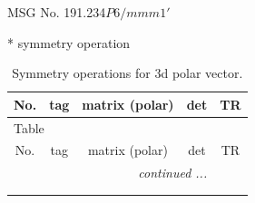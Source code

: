 \documentclass[fleqn,8pt]{jsarticle}
\begin{document}
\setcounter{MaxMatrixCols}{32}

\renewcommand{\tablename}{Table~}
\renewcommand{\figurename}{Figure~}
\begin{center}
\LARGE
MSG No. 191.234\quad$P6/mmm1'$
\end{center}
* symmetry operation
\renewcommand{\arraystretch}{1.3}
\begin{longtable}{ccccc}
\caption{Symmetry operations for 3d polar vector.}
 \\
 \hline \hline
No. & tag & matrix (polar) & det & TR \\ \hline \endfirsthead

\multicolumn{4}{l}{\tablename\ \thetable{}} \\
 \hline \hline
No. & tag & matrix (polar) & det & TR \\ \hline \endhead

 \hline \hline
\multicolumn{4}{r}{\footnotesize\it continued ...} \\ \endfoot

 \hline \hline
\multicolumn{4}{r}{} \\ \endlastfoot


\end{longtable}
\end{document}
